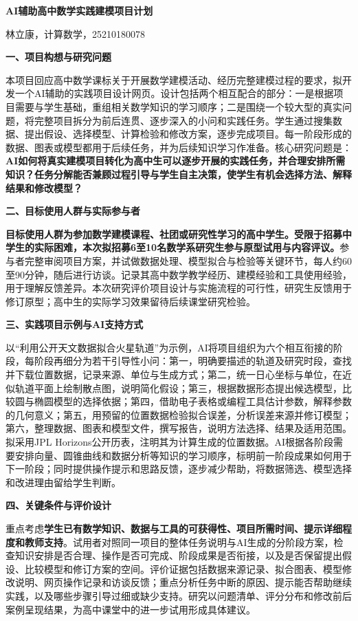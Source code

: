 \documentclass[UTF8,a4paper,11pt,fontset=windows]{ctexart}
\newcommand{\lead}[1]{\par\noindent\textbf{#1}\par\nobreak}
\begin{document}
\begin{center}
  {\bfseries AI辅助高中数学实践建模项目计划}\par
  \vspace{0.3em}
  { 林立康，计算数学，25210180078}
\end{center}
\vspace{-0.5em}

\lead{一、项目构想与研究问题}
本项目回应高中数学课标关于开展数学建模活动、经历完整建模过程的要求，拟开发一个AI辅助的实践项目设计网页。设计包括两个相互配合的部分：一是根据项目需要与学生基础，重组相关数学知识的学习顺序；二是围绕一个较大型的真实问题，将完整项目拆分为前后连贯、逐步深入的小问和实践任务。学生通过搜集数据、提出假设、选择模型、计算检验和修改方案，逐步完成项目。每一阶段形成的数据、图表或模型都用于后续任务，并为后续知识学习作准备。核心研究问题是：\textbf{AI如何将真实建模项目转化为高中生可以逐步开展的实践任务，并合理安排所需知识？任务分解能否兼顾过程引导与学生自主决策，使学生有机会选择方法、解释结果和修改模型？}

\lead{二、目标使用人群与实际参与者}
\textbf{目标使用人群为参加数学建模课程、社团或研究性学习的高中学生。受限于招募中学生的实际困难，本次拟招募6至10名数学系研究生参与原型试用与内容评议。}参与者完整审阅项目方案，并试做数据处理、模型拟合与检验等关键环节，每人约60至90分钟，随后进行访谈。记录其高中数学教学经历、建模经验和工具使用经验，用于理解反馈差异。本次研究评价项目设计与实施流程的可行性，研究生反馈用于修订原型；高中生的实际学习效果留待后续课堂研究检验。

\lead{三、实践项目示例与AI支持方式}
以“利用公开天文数据拟合火星轨道”为示例，AI将项目组织为六个相互衔接的阶段，每阶段再细分为若干引导性小问：第一，明确要描述的轨道及研究时段，查找并下载位置数据，记录来源、单位与生成方式；第二，统一日心坐标与单位，在近似轨道平面上绘制散点图，说明简化假设；第三，根据数据形态提出候选模型，比较圆与椭圆模型的选择依据；第四，借助电子表格或编程工具估计参数，解释参数的几何意义；第五，用预留的位置数据检验拟合误差，分析误差来源并修订模型；第六，整理数据、图表和模型文件，撰写报告，说明方法选择、结果及适用范围。拟采用JPL Horizons公开历表，注明其为计算生成的位置数据。AI根据各阶段需要安排向量、圆锥曲线和数据分析等知识的学习顺序，标明前一阶段成果如何用于下一阶段；同时提供操作提示和思路反馈，逐步减少帮助，将数据筛选、模型选择和改进理由留给学生判断。

\lead{四、关键条件与评价设计}
重点考虑\textbf{学生已有数学知识、数据与工具的可获得性、项目所需时间、提示详细程度和教师支持}。试用者对照同一项目的整体任务说明与AI生成的分阶段方案，检查知识安排是否合理、操作是否可完成、阶段成果是否衔接，以及是否保留提出假设、比较模型和修订方案的空间。评价证据包括数据来源记录、拟合图表、模型修改说明、网页操作记录和访谈反馈；重点分析任务中断的原因、提示能否帮助继续实践，以及哪些步骤引导过细或缺少支持。研究以问题清单、评分分布和修改前后案例呈现结果，为高中课堂中的进一步试用形成具体建议。
\end{document}
